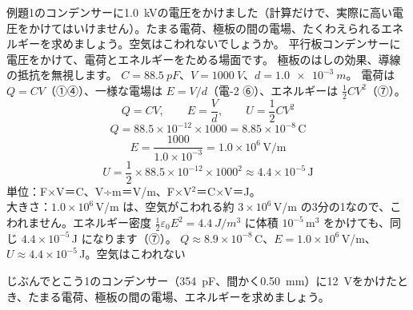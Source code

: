 \label{ph:電-3:ex2}
\begin{phreidai}
例題1のコンデンサーに\qty{1.0}{kV}の電圧をかけました（計算だけで、実際に高い電圧をかけてはいけません）。たまる電荷、極板の間の電場、たくわえられるエネルギーを求めましょう。空気はこわれないでしょうか。
\phbamen
平行板コンデンサーに電圧をかけて、電荷とエネルギーをためる場面です。
\phmushi
極板のはしの効果、導線の抵抗を無視します。
\phzu
$C=\qty{88.5}{pF}$、$V=\qty{1000}{V}$、$d=\qty{1.0e-3}{m}$。
\phriyu
電荷は $Q=CV$（①④）、一様な電場は $E=V/d$（電-2 ⑥）、エネルギーは $\tfrac12CV^2$（⑦）。
\phtateru
\[Q=CV,\qquad E=\frac{V}{d},\qquad U=\frac12CV^2\]
\phtoku
\[Q=88.5\times10^{-12}\times1000=8.85\times10^{-8}\,\text{C}\]
\[E=\frac{1000}{1.0\times10^{-3}}=1.0\times10^6\,\text{V/m}\]
\[U=\frac12\times88.5\times10^{-12}\times1000^2\approx4.4\times10^{-5}\,\text{J}\]
\phtashikame
単位：F×V＝C、V÷m＝V/m、F×V$^2$＝C×V＝J。\\
大きさ：$1.0\times10^6$\,V/m は、空気がこわれる約 $3\times10^6$\,V/m の3分の1なので、こわれません。エネルギー密度 $\tfrac12\varepsilon_0E^2=\qty{4.4}{J/m^3}$ に体積 $10^{-5}$\,m$^3$ をかけても、同じ $4.4\times10^{-5}$\,J になります（⑦）。
\kotae $Q\approx8.9\times10^{-8}$\,C、$E=1.0\times10^6$\,V/m、$U\approx4.4\times10^{-5}$\,J。空気はこわれない
\end{phreidai}
\begin{jibun}
じぶんでとこう1のコンデンサー（\qty{354}{pF}、間かく\qty{0.50}{mm}）に\qty{12}{V}をかけたとき、たまる電荷、極板の間の電場、エネルギーを求めましょう。
\end{jibun}

